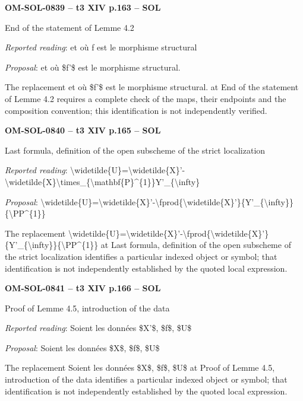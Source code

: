 \par\noindent\textbf{OM-SOL-0839 -- t3 XIV p.163 -- SOL}\par
End of the statement of Lemme 4.2\par
\emph{Reported reading}: et où f est le morphisme structural\par
\emph{Proposal}: et où \$f'\$ est le morphisme structural.\par
The replacement et où \$f'\$ est le morphisme structural. at End of the statement of Lemme 4.2 requires a complete check of the maps, their endpoints and the composition convention; this identification is not independently verified.\par
\par\noindent\textbf{OM-SOL-0840 -- t3 XIV p.165 -- SOL}\par
Last formula, definition of the open subscheme of the strict localization\par
\emph{Reported reading}: \textbackslash{}widetilde\{U\}=\allowbreak \textbackslash{}widetilde\{X\}'-\textbackslash{}widetilde\{X\}\textbackslash{}times\_\{\textbackslash{}mathbf\{P\}\textasciicircum{}\{1\}\}Y'\_\{\textbackslash{}infty\}\par
\emph{Proposal}: \textbackslash{}widetilde\{U\}=\allowbreak \textbackslash{}widetilde\{X\}'-\textbackslash{}fprod\{\textbackslash{}widetilde\{X\}'\}\{Y'\_\{\textbackslash{}infty\}\}\{\textbackslash{}PP\textasciicircum{}\{1\}\}\par
The replacement \textbackslash{}widetilde\{U\}=\allowbreak \textbackslash{}widetilde\{X\}'-\textbackslash{}fprod\{\textbackslash{}widetilde\{X\}'\}\{Y'\_\{\textbackslash{}infty\}\}\{\textbackslash{}PP\textasciicircum{}\{1\}\} at Last formula, definition of the open subscheme of the strict localization identifies a particular indexed object or symbol; that identification is not independently established by the quoted local expression.\par
\par\noindent\textbf{OM-SOL-0841 -- t3 XIV p.166 -- SOL}\par
Proof of Lemme 4.5, introduction of the data\par
\emph{Reported reading}: Soient les données \$X'\$, \$f\$, \$U\$\par
\emph{Proposal}: Soient les données \$X\$, \$f\$, \$U\$\par
The replacement Soient les données \$X\$, \$f\$, \$U\$ at Proof of Lemme 4.5, introduction of the data identifies a particular indexed object or symbol; that identification is not independently established by the quoted local expression.\par
